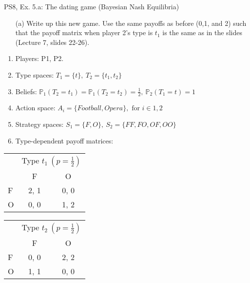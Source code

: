 \begin{frame}{PS8, Ex. 5.a: The dating game (Bayesian Nash Equilibria)}
    \begin{itemize}
      \item[(a)] Write up this new game. Use the same payoffs as before (0,1, and 2) such that the payoff matrix when player 2’s type is $t_1$ is the same as in the slides (Lecture 7, slides 22-26).
    \end{itemize}
    \vspace{-4pt}
    \begin{enumerate}
      \item Players: P1, P2.
      \item Type spaces: $T_1=\{t\},\ T_2=\{t_1,t_2\}$
      \item Beliefs: $\mathbb{P}_1(T_2=t_1)=\mathbb{P}_1(T_2=t_2)=\frac{1}{2},\ \mathbb{P}_2(T_1=t)=1$
      \item Action space: $A_i=\{Football,Opera\},\text{ for }i\in1,2$
      \item Strategy spaces: $S_1=\{F,O\},\ S_2=\{FF,FO,OF,OO\}$
      \item Type-dependent payoff matrices:
    \end{enumerate}
    \vspace{-8pt}
    \begin{table}
      \begin{tabular}{l|c|c|}
        \multicolumn{1}{c}{} & \multicolumn{2}{c}{Type $t_1\ (p=\frac{1}{2})$} \\
        \multicolumn{1}{c}{} & \multicolumn{1}{c}{F} & \multicolumn{1}{c}{O} \\\cline{2-3}
        F & 2, 1 & 0, 0 \\\cline{2-3}
        O & 0, 0 & 1, 2 \\\cline{2-3}
      \end{tabular}\quad\quad
      \begin{tabular}{l|c|c|}
        \multicolumn{1}{c}{} & \multicolumn{2}{c}{Type $t_2\ (p=\frac{1}{2})$} \\
        \multicolumn{1}{c}{} & \multicolumn{1}{c}{F} & \multicolumn{1}{c}{O} \\\cline{2-3}
        F & 0, 0 & 2, 2 \\\cline{2-3}
        O & 1, 1 & 0, 0 \\\cline{2-3}
      \end{tabular}
    \end{table}
    \vfill\null
\end{frame}

